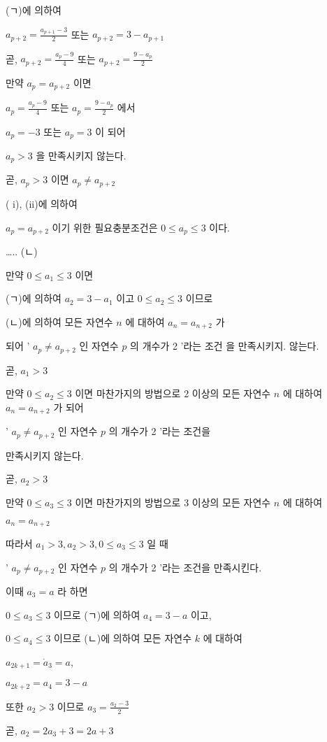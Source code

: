 \documentclass[10pt]{article}
\begin{document}
(ㄱ)에 의하여

$a_{p+2}=\frac{a_{p+1}-3}{2}$ 또는 $a_{p+2}=3-a_{p+1}$

곧, $a_{p+2}=\frac{a_{p}-9}{4}$ 또는 $a_{p+2}=\frac{9-a_{p}}{2}$

만약 $a_{p}=a_{p+2}$ 이면

$a_{p}=\frac{a_{p}-9}{4}$ 또는 $a_{p}=\frac{9-a_{p}}{2}$ 에서

$a_{p}=-3$ 또는 $a_{p}=3$ 이 되어

$a_{p}>3$ 을 만족시키지 않는다.

곧, $a_{p}>3$ 이면 $a_{p} \neq a_{p+2}$

( i), (ii)에 의하여

$a_{p}=a_{p+2}$ 이기 위한 필요충분조건은 $0 \leq a_{p} \leq 3$ 이다.

….. (ㄴ)

만약 $0 \leq a_{1} \leq 3$ 이면

(ㄱ)에 의하여 $a_{2}=3-a_{1}$ 이고 $0 \leq a_{2} \leq 3$ 이므로

(ㄴ)에 의하여 모든 자연수 $n$ 에 대하여 $a_{n}=a_{n+2}$ 가

되어 ' $a_{p} \neq a_{p+2}$ 인 자연수 $p$ 의 개수가 2 '라는 조건 을 만족시키지. 않는다.

곧, $a_{1}>3$

만약 $0 \leq a_{2} \leq 3$ 이면 마찬가지의 방법으로 2 이상의 모든 자연수 $n$ 에 대하여 $a_{n}=a_{n+2}$ 가 되어

' $a_{p} \neq a_{p+2}$ 인 자연수 $p$ 의 개수가 2 '라는 조건을

만족시키지 않는다.

곧, $a_{2}>3$

만약 $0 \leq a_{3} \leq 3$ 이면 마찬가지의 방법으로 3 이상의 모든 자연수 $n$ 에 대하여

$a_{n}=a_{n+2}$

따라서 $a_{1}>3, a_{2}>3,0 \leq a_{3} \leq 3$ 일 때

' $a_{p} \neq a_{p+2}$ 인 자연수 $p$ 의 개수가 2 '라는 조건을 만족시킨다.

이때 $a_{3}=a$ 라 하면

$0 \leq a_{3} \leq 3$ 이므로 (ㄱ)에 의하여 $a_{4}=3-a$ 이고,

$0 \leq a_{4} \leq 3$ 이므로 (ㄴ)에 의하여 모든 자연수 $k$ 에 대하여

$a_{2 k+1}=\dot{a}_{3}=a$,

$a_{2 k+2}=a_{4}=3-a$

또한 $a_{2}>3$ 이므로 $a_{3}=\frac{a_{2}-3}{2}$

곧, $a_{2}=2 a_{3}+3=2 a+3$
\end{document}
